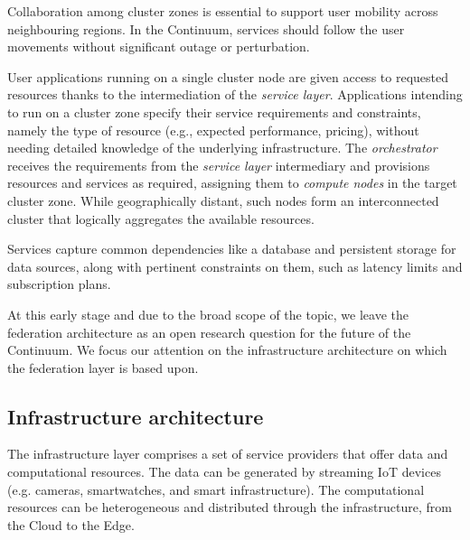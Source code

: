 Collaboration among cluster zones is essential to support user mobility across neighbouring regions. 
In the Continuum, services should follow the user movements without significant outage or perturbation.

User applications running on a single cluster node are given access to requested resources thanks to the intermediation of the \textit{service layer}. Applications intending to run on a cluster zone specify their service requirements and constraints, namely the type of resource (e.g., expected performance, pricing), without needing detailed knowledge of the underlying infrastructure. 
The \textit{orchestrator} receives the requirements from the \textit{service layer} intermediary and provisions resources and services as required, assigning them to \textit{compute nodes} in the target cluster zone.
While geographically distant, such nodes form an interconnected cluster that logically aggregates the available resources.

Services capture common dependencies like a database and persistent storage for data sources, along with pertinent constraints on them, such as latency limits and subscription plans.

At this early stage and due to the broad scope of the topic, we leave the federation architecture as an open research question for the future of the Continuum. We focus our attention on the infrastructure architecture on which the federation layer is based upon.

\subsection{Infrastructure architecture}

The infrastructure layer comprises a set of service providers that offer data and computational resources. The data can be generated by streaming IoT devices (e.g. cameras, smartwatches, and smart infrastructure). 
The computational resources can be heterogeneous and distributed through the infrastructure, from the Cloud to the Edge.

